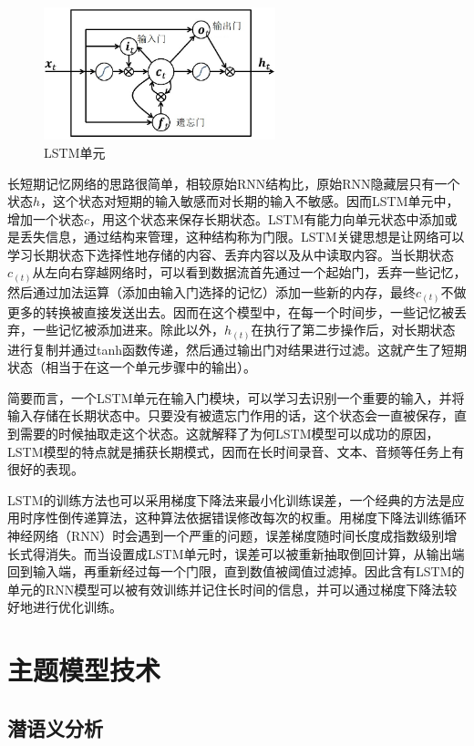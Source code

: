 \documentclass[winfonts,master,oneside,nobackinfo]{njuthesis}
\begin{document}
\begin{figure}[h]
\centering
\includegraphics[width=0.6\textwidth]{./figure/LSTM.jpg}
\caption{LSTM单元}
\label{lstm}
\end{figure}

长短期记忆网络的思路很简单，相较原始RNN结构比，原始RNN隐藏层只有一个状态$h$，这个状态对短期的输入敏感而对长期的输入不敏感。因而LSTM单元中，增加一个状态$c$，用这个状态来保存长期状态。LSTM有能力向单元状态中添加或是丢失信息，通过结构来管理，这种结构称为门限。LSTM关键思想是让网络可以学习长期状态下选择性地存储的内容、丢弃内容以及从中读取内容。当长期状态${ c } _ { ( t ) }$从左向右穿越网络时，可以看到数据流首先通过一个起始门，丢弃一些记忆，然后通过加法运算（添加由输入门选择的记忆）添加一些新的内存，最终${ c } _ { ( t ) }$不做更多的转换被直接发送出去。因而在这个模型中，在每一个时间步，一些记忆被丢弃，一些记忆被添加进来。除此以外，${ h } _ { ( t ) }$在执行了第二步操作后，对长期状态进行复制并通过tanh函数传递，然后通过输出门对结果进行过滤。这就产生了短期状态（相当于在这一个单元步骤中的输出）。

简要而言，一个LSTM单元在输入门模块，可以学习去识别一个重要的输入，并将输入存储在长期状态中。只要没有被遗忘门作用的话，这个状态会一直被保存，直到需要的时候抽取走这个状态。这就解释了为何LSTM模型可以成功的原因，LSTM模型的特点就是捕获长期模式，因而在长时间录音、文本、音频等任务上有很好的表现。

LSTM的训练方法也可以采用梯度下降法来最小化训练误差，一个经典的方法是应用时序性倒传递算法，这种算法依据错误修改每次的权重。用梯度下降法训练循环神经网络（RNN）时会遇到一个严重的问题，误差梯度随时间长度成指数级别增长式得消失。而当设置成LSTM单元时，误差可以被重新抽取倒回计算，从输出端回到输入端，再重新经过每一个门限，直到数值被阈值过滤掉。因此含有LSTM的单元的RNN模型可以被有效训练并记住长时间的信息，并可以通过梯度下降法较好地进行优化训练。

\section{主题模型技术}

\subsection{潜语义分析}
\end{document}
